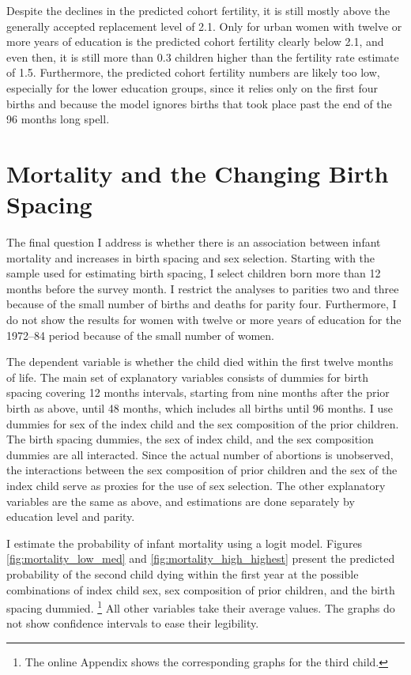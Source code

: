 \documentclass[12pt,letterpaper]{article}
\begin{document}
%

Despite the declines in the predicted cohort fertility, it is still mostly above the 
generally accepted replacement level of 2.1.
Only for urban women with twelve or more years of education is the predicted cohort
fertility clearly below 2.1, and even then, it is still more than 0.3 children higher than 
the fertility rate estimate of 1.5.
Furthermore, the predicted cohort fertility numbers are likely too low,
especially for the lower education groups, since it relies only on the
first four births and because the model ignores births that took place past the end
of the 96 months long spell.


\section{Mortality and the Changing Birth Spacing\label{sec:mortality}}

The final question I address is whether there is an association between infant mortality 
and increases in birth spacing and sex selection. 
Starting with the sample used for estimating birth spacing, I select children born more 
than 12 months before the survey month. 
I restrict the analyses to parities two and three because of the small number of births 
and deaths for parity four. 
Furthermore, I do not show the results for women with twelve or more years of education 
for the 1972--84 period because of the small number of women.

The dependent variable is whether the child died within the first twelve
months of life.
The main set of explanatory variables consists of dummies for birth spacing
covering 12 months intervals, starting from nine months after the prior birth 
as above, until 48 months, which includes all births until 96 months.
I use dummies for sex of the index child and the sex composition 
of the prior children.
The birth spacing dummies, the sex of index child, and the sex composition dummies
are all interacted.
Since the actual number of abortions is unobserved, the interactions between
the sex composition of prior children and the sex of the index child serve
as proxies for the use of sex selection.
The other explanatory variables are the same as above, and estimations
are done separately by education level and parity.

I estimate the probability of infant mortality using a logit model.
Figures \ref{fig:mortality_low_med} and \ref{fig:mortality_high_highest} present 
the predicted probability of the second child dying within the first year at the 
possible combinations of index child sex, sex composition of prior children, and 
the birth spacing dummied.%
\footnote{
The online Appendix shows the corresponding graphs for the third child.
}
All other variables take their average values.
The graphs do not show confidence intervals to ease their legibility.
\end{document}
